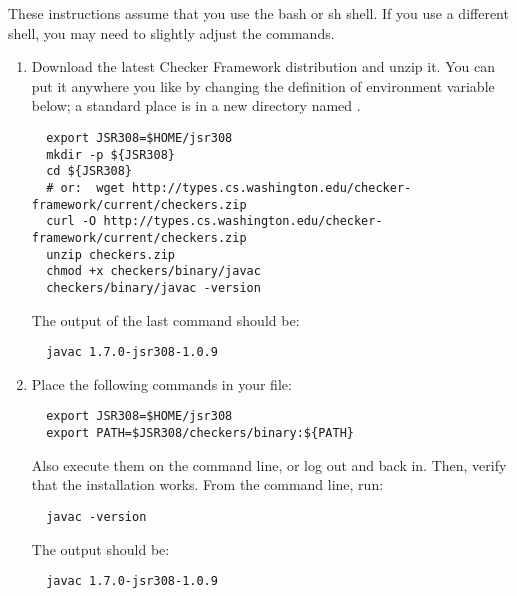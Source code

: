 These instructions assume that you use the bash or sh shell.  If you use a
different shell, you may need to slightly adjust the commands.

\begin{enumerate}

\item
  Download the latest Checker Framework distribution
  and unzip it.  You can put it anywhere you like by changing the
  definition of environment variable  below; a standard place
  is in a
  new directory named .

\begin{Verbatim}
  export JSR308=$HOME/jsr308
  mkdir -p ${JSR308}
  cd ${JSR308}
  # or:  wget http://types.cs.washington.edu/checker-framework/current/checkers.zip
  curl -O http://types.cs.washington.edu/checker-framework/current/checkers.zip
  unzip checkers.zip
  chmod +x checkers/binary/javac
  checkers/binary/javac -version
\end{Verbatim}

The output of the last command should be:

\begin{Verbatim}
  javac 1.7.0-jsr308-1.0.9
\end{Verbatim}


\item
  Place the following commands in your  file:
\begin{Verbatim}
  export JSR308=$HOME/jsr308
  export PATH=$JSR308/checkers/binary:${PATH}
\end{Verbatim}


Also execute them on the command line, or log out and back in.  Then,
verify that the installation works.  From the command line, run:

\begin{Verbatim}
  javac -version
\end{Verbatim}

The output should be:

\begin{Verbatim}
  javac 1.7.0-jsr308-1.0.9
\end{Verbatim}

\end{enumerate}

